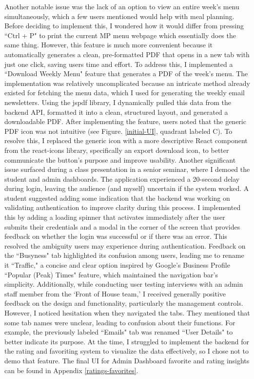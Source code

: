 \documentclass[10pt,twocolumn]{article}
\begin{document}
Another notable issue was the lack of an option to view an entire week's menu simultaneously, which a few users mentioned would help with meal planning.  Before deciding to implement this, I wondered how it would differ from pressing ``Ctrl + P" to print the current MP menu webpage which essentially does the same thing. However, this feature is much more convenient because it automatically generates a clean, pre-formatted PDF that opens in a new tab with just one click, saving users time and effort. To address this, I implemented a ``Download Weekly Menu" feature that generates a PDF of the week’s menu. The implementation was relatively uncomplicated because an intricate method already existed for fetching the menu data, which I used for generating the weekly email newsletters. Using the jspdf library, I dynamically pulled this data from the backend API, formatted it into a clean, structured layout, and generated a downloadable PDF. After implementing the feature, users noted that the generic PDF icon was not intuitive (see Figure. \ref{initial-UI}, quadrant labeled C). To resolve this, I replaced the generic icon with a more descriptive React component from the react-icons library, specifically an export download icon, to better communicate the button's purpose and improve usability. 
Another significant issue surfaced during a class presentation in a senior seminar, where I demoed the student and admin dashboards. The application experienced a 20-second delay during login, leaving the audience (and myself) uncertain if the system worked. A student suggested adding some indication that the backend was working on validating authentication to improve clarity during this process. I implemented this by adding a loading spinner that activates immediately after the user submits their credentials and a modal in the corner of the screen that provides feedback on whether the login was successful or if there was an error. This resolved the ambiguity users may experience during authentication. Feedback on the ``Busyness" tab highlighted its confusion among users, leading me to rename it ``Traffic," a concise and clear option inspired by Google’s Business Profile ``Popular (Peak) Times" feature, which maintained the navigation bar’s simplicity.
Additionally, while conducting user testing interviews with an admin staff member from the ‘Front of House team,’ I received generally positive feedback on the design and functionality, particularly the management controls. However, I noticed hesitation when they navigated the tabs. They mentioned that some tab names were unclear, leading to confusion about their functions. For example, the previously labeled ``Emails" tab was renamed ``User Details" to better indicate its purpose. At the time, I struggled to implement the backend for the rating and favoriting system to visualize the data effectively, so I chose not to demo that feature. The final UI for Admin Dashboard favorite and rating insights can be found in Appendix \ref{ratings-favorites}. 
\end{document}
